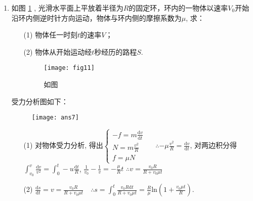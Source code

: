\begin{enumerate}
\begin{solution}
    \end{solution}
    \item 如图 \ref{Fig:11} , 光滑水平面上平放着半径为$R$的固定环，环内的一物体以速率$V_0$开始沿环内侧逆时针方向运动，物体与环内侧的摩擦系数为$\mu$, 求：
    \begin{enumerate}
        \item[(1)] 物体任一时刻$t$的速率$V$；                                            
        \item[(2)] 物体从开始运动经$t$秒经历的路程$S$.
        \begin{figure}[H]
            \centering
            \texttt{[image: fig11]}
            \caption{如图}\label{Fig:11}
        \end{figure} 
    \end{enumerate}
    \begin{solution}
        受力分析图如下：
        \begin{figure}[H]
            \centering
            \texttt{[image: ans7]}
        \end{figure} 
        \begin{enumerate}
            \item[(1)]对物体受力分析, 得出$\begin{cases}
                -f = m\frac{\mathrm{d}v}{\mathrm{d}t} \\
                N = m\frac{v^2}{R}\\
                f = \mu N
            \end{cases}$ \ \ $\therefore -\mu \frac{v^2}{R} = \frac{\mathrm{d}v}{\mathrm{d}t}$, 对两边积分得 
            $\displaystyle{\int_{v_0}^{v} \frac{\mathrm{d}v}{v^2}}=\int_0^t -u \frac{\mathrm{d}t}{R}$, $\frac{1}{v_0}-\frac{1}{v}=-\frac{\mu}{R}t$
            $\therefore v = \frac{v_0R}{R+v_0 \mu t}$
            \item[(2)] $\frac{\mathrm{d}s}{\mathrm{d}t}=v=\frac{v_0R}{R+v_0\mu t}$\ \ 
            $\therefore s = \displaystyle{\int_0^t \frac{v_0 R\mathrm{d}t}{R+v_0\mu t}=\frac{R}{\mu}\mathrm{ln}(1+\frac{v_0\mu t}{R})}$. 
        \end{enumerate}
    \end{solution}
\end{enumerate}
